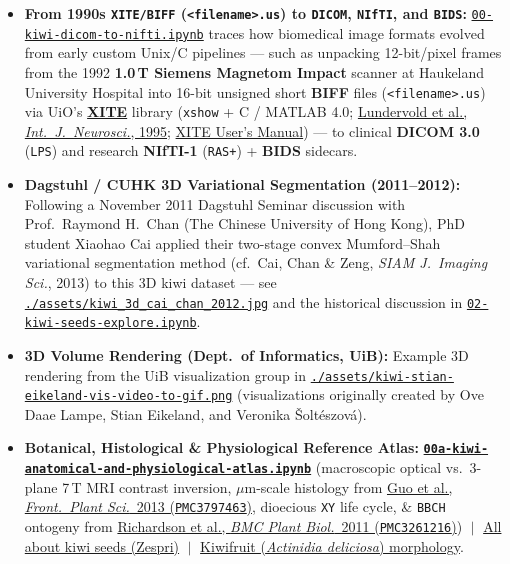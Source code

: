 \documentclass[10pt,a4paper]{article}
\newcommand{\ghblob}{https://github.com/arvidl/BMED365-2027/blob/main}
\begin{document}
\begin{itemize}
    \item \textbf{From 1990s \texttt{XITE/BIFF} (\texttt{<filename>.us}) to \texttt{DICOM}, \texttt{NIfTI}, and \texttt{BIDS}:} \href{\ghblob/Lab4-Comp-Imag/Kiwi-challenge/notebooks/00-kiwi-dicom-to-nifti.ipynb}{\texttt{00-kiwi-dicom-to-nifti.ipynb}} traces how biomedical image formats evolved from early custom Unix/C pipelines --- such as unpacking 12-bit/pixel frames from the 1992 \textbf{1.0\,T Siemens Magnetom Impact} scanner at Haukeland University Hospital into 16-bit unsigned short \textbf{BIFF} files (\texttt{<filename>.us}) via UiO's \href{https://www.mn.uio.no/ifi/english/research/groups/dsb/resources/software/xite/}{\textbf{XITE}} library (\texttt{xshow} + C / MATLAB 4.0; \href{https://www.tandfonline.com/doi/abs/10.3109/00207459509004883}{Lundervold et al., \textit{Int.\ J.\ Neurosci.}, 1995}; \href{https://www.mn.uio.no/ifi/english/research/groups/dsb/resources/software/xite/usersmanual.pdf}{XITE User's Manual}) --- to clinical \textbf{DICOM 3.0} (\texttt{LPS}) and research \textbf{NIfTI-1} (\texttt{RAS+}) + \textbf{BIDS} sidecars.
    \item \textbf{Dagstuhl / CUHK 3D Variational Segmentation (2011--2012):} Following a November 2011 Dagstuhl Seminar discussion with Prof.\ Raymond H.\ Chan (The Chinese University of Hong Kong), PhD student Xiaohao Cai applied their two-stage convex Mumford--Shah variational segmentation method (cf.\ Cai, Chan \& Zeng, \textit{SIAM J.\ Imaging Sci.}, 2013) to this 3D kiwi dataset --- see \href{\ghblob/Lab4-Comp-Imag/Kiwi-challenge/assets/kiwi_3d_cai_chan_2012.jpg}{\texttt{./assets/kiwi\_3d\_cai\_chan\_2012.jpg}} and the historical discussion in \href{\ghblob/Lab4-Comp-Imag/Kiwi-challenge/notebooks/02-kiwi-seeds-explore.ipynb}{\texttt{02-kiwi-seeds-explore.ipynb}}.
    \item \textbf{3D Volume Rendering (Dept.\ of Informatics, UiB):} Example 3D rendering from the UiB visualization group in \href{\ghblob/Lab4-Comp-Imag/Kiwi-challenge/assets/kiwi-stian-eikeland-vis-video-to-gif.png}{\texttt{./assets/kiwi-stian-eikeland-vis-video-to-gif.png}} (visualizations originally created by Ove Daae Lampe, Stian Eikeland, and Veronika \v{S}olt\'eszov\'a).
    \item \textbf{Botanical, Histological \& Physiological Reference Atlas:} \href{\ghblob/Lab5-Comp-Mod/Kiwi-challenge/notebooks/00a-kiwi-anatomical-and-physiological-atlas.ipynb}{\textbf{\nolinkurl{00a-kiwi-anatomical-and-physiological-atlas.ipynb}}} (macroscopic optical vs.\ 3-plane 7\,T MRI contrast inversion, $\mu\text{m}$-scale histology from \href{https://pmc.ncbi.nlm.nih.gov/articles/PMC3797463/}{Guo et al., \textit{Front.\ Plant Sci.}\ 2013 (\texttt{PMC3797463})}, dioecious \texttt{XY} life cycle, \& \texttt{BBCH} ontogeny from \href{https://pmc.ncbi.nlm.nih.gov/articles/PMC3261216/}{Richardson et al., \textit{BMC Plant Biol.}\ 2011 (\texttt{PMC3261216})}) $\;\vert\;$ \href{https://www.zespri.com/en-IN/blogdetail/all-about-kiwi-seeds}{All about kiwi seeds (Zespri)} $\;\vert\;$ \href{https://en.wikipedia.org/wiki/Kiwifruit}{Kiwifruit (\textit{Actinidia deliciosa}) morphology}.
\end{itemize}
\end{document}
